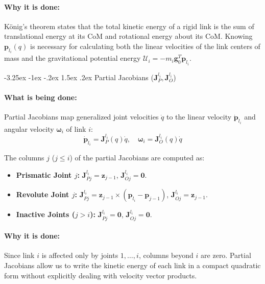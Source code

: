 \documentclass[11pt, a4paper]{article}
\makeatletter
\renewcommand{\subsection}{\@startsection{subsection}{2}{\z@}%
    {-3.25ex \@plus -1ex \@minus -.2ex}%
    {1.5ex \@plus .2ex}%
    {\normalfont\large\bfseries\color{brandaccent}}}
\makeatother
\begin{document}
\paragraph{Why it is done:}
König's theorem states that the total kinetic energy of a rigid link is the sum of translational energy at its CoM and rotational energy about its CoM. Knowing $\mathbf{p}_{l_i}(q)$ is necessary for calculating both the linear velocities of the link centers of mass and the gravitational potential energy $\mathcal{U}_i = -m_i \mathbf{g}_0^T \mathbf{p}_{l_i}$.

\subsection{Partial Jacobians (\texorpdfstring{$\mathbf{J}_P^{l_i}, \mathbf{J}_O^{l_i}$}{JP\_li, JO\_li})}
\paragraph{What is being done:}
Partial Jacobians map generalized joint velocities $\dot{q}$ to the linear velocity $\dot{\mathbf{p}}_{l_i}$ and angular velocity $\boldsymbol{\omega}_i$ of link $i$:
\begin{equation}
    \dot{\mathbf{p}}_{l_i} = \mathbf{J}_P^{l_i}(q) \dot{q}, \quad \boldsymbol{\omega}_i = \mathbf{J}_O^{l_i}(q) \dot{q}
\end{equation}

The columns $j$ ($j \le i$) of the partial Jacobians are computed as:
\begin{itemize}[leftmargin=1.5em]
    \item \textbf{Prismatic Joint $j$:} $\mathbf{J}_{Pj}^{l_i} = \mathbf{z}_{j-1}$, $\mathbf{J}_{Oj}^{l_i} = \mathbf{0}$.
    \item \textbf{Revolute Joint $j$:} $\mathbf{J}_{Pj}^{l_i} = \mathbf{z}_{j-1} \times (\mathbf{p}_{l_i} - \mathbf{p}_{j-1})$, $\mathbf{J}_{Oj}^{l_i} = \mathbf{z}_{j-1}$.
    \item \textbf{Inactive Joints ($j > i$):} $\mathbf{J}_{Pj}^{l_i} = \mathbf{0}$, $\mathbf{J}_{Oj}^{l_i} = \mathbf{0}$.
\end{itemize}

\paragraph{Why it is done:}
Since link $i$ is affected only by joints $1, \dots, i$, columns beyond $i$ are zero. Partial Jacobians allow us to write the kinetic energy of each link in a compact quadratic form without explicitly dealing with velocity vector products.
\end{document}
